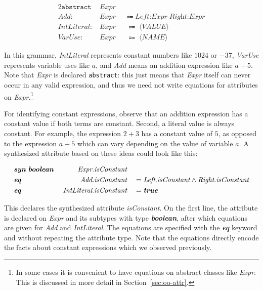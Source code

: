 \documentclass[10pt, twoside, openright]{book}
\newcommand{\secref}[1]{Section~\ref{#1}}
\begin{document}
\begin{alignat*}{2}
\texttt{abstract} \; & \textit{Expr} & & \\
\textit{Add} : \; & \textit{Expr} & & \Coloneqq \; \textit{Left:Expr} \; \textit{Right:Expr} \\
\textit{IntLiteral} : \; & \textit{Expr} & & \Coloneqq \; \langle\textit{VALUE}\rangle \\
\textit{VarUse} : \; & \textit{Expr} & & \Coloneqq \; \langle\textit{NAME}\rangle
\end{alignat*}

\noindent
In this grammar, \emph{IntLiteral} represents constant numbers like $1024$
or $-37$,
\emph{VarUse} represents variable uses like $a$, and
\emph{Add} means an addition expression like $a+5$.
Note that \emph{Expr} is declared \verb'abstract': this just means that
\emph{Expr} itself can never occur in any valid expression, and thus we need
not write equations for attributes on \emph{Expr}.\footnote{In some cases
it is convenient to have equations on abstract classes like \emph{Expr}.
This is discussed in more detail in \secref{sec:oo-attr}.}

\newpage
For identifying constant expressions, observe that an addition expression has a constant
value if both terms are constant. Second, a literal value is always constant.
For example, the expression $2+3$ has a constant value of
$5$, as opposed to the expression $a+5$ which can vary depending on the value of
variable $a$. A synthesized attribute based on these ideas could look
like this:

\begin{alignat*}{3}
& \textbf{\textit{syn}} \; \textbf{\textit{boolean}} & \; \textit{Expr}.&\textit{isConstant} && \\
& \textbf{\textit{eq}} & \; \textit{Add}.&\textit{isConstant} &&= \textit{Left}.\textit{isConstant} \land \textit{Right}.\textit{isConstant} \\
& \textbf{\textit{eq}} & \; \textit{IntLiteral}.&\textit{isConstant} &&= \textbf{\textit{true}}
\end{alignat*}

\noindent
This declares the synthesized attribute \emph{isConstant}.
On the first line, 
the attribute is declared on \emph{Expr} and its subtypes with type \emph{\textbf{boolean}},
after which equations are given for \emph{Add} and \emph{IntLiteral}. The
equations are specified with the \emph{\textbf{eq}} keyword and without repeating the attribute type.
Note that the equations directly encode the facts about constant expressions which we observed
previously.
\end{document}
